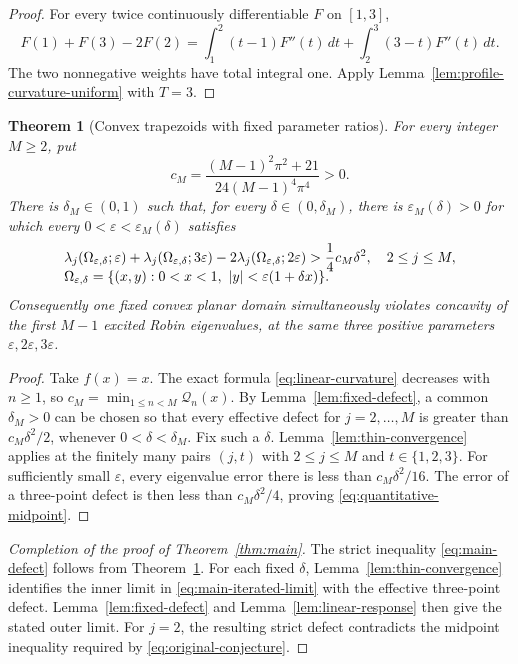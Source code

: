 \documentclass[11pt,a4paper]{article}
\newtheorem{theorem}{Theorem}[section]
\theoremstyle{definition}\newtheorem{definition}[theorem]{Definition}
\theoremstyle{remark}\newtheorem{remark}[theorem]{Remark}
\begin{document}
\begin{proof}
For every twice continuously differentiable $F$ on $[1,3]$,
\[
 F(1)+F(3)-2F(2)
  =\int_1^2(t-1)F''(t)\,dt
     +\int_2^3(3-t)F''(t)\,dt.
\]
The two nonnegative weights have total integral one. Apply
Lemma~\ref{lem:profile-curvature-uniform} with $T=3$.
\end{proof}

\begin{theorem}[Convex trapezoids with fixed parameter ratios]
\label{thm:fixed-ratio-trapezoids}
For every integer $M\geq2$, put
\[
 c_M=\frac{(M-1)^2\pi^2+21}{24(M-1)^4\pi^4}>0.
\]
There is $\delta_M\in(0,1)$ such that, for every
$\delta\in(0,\delta_M)$, there is
$\varepsilon_M(\delta)>0$ for which every
$0<\varepsilon<\varepsilon_M(\delta)$ satisfies
\begin{align}
 &\lambda_j(\Omega_{\varepsilon,\delta};\varepsilon)
 +\lambda_j(\Omega_{\varepsilon,\delta};3\varepsilon)
 -2\lambda_j(\Omega_{\varepsilon,\delta};2\varepsilon)
 >\frac14c_M\delta^2,
 \quad 2\leq j\leq M,\label{eq:quantitative-midpoint}\\[-2mm]
 &\Omega_{\varepsilon,\delta}
 =\{(x,y):0<x<1,\ |y|<\varepsilon(1+\delta x)\}.
 \notag
\end{align}
Consequently one fixed convex planar domain simultaneously
violates concavity of the first $M-1$ excited Robin eigenvalues,
at the same three positive parameters $\varepsilon,2\varepsilon,
3\varepsilon$.
\end{theorem}

\begin{proof}
Take $f(x)=x$. The exact formula
\eqref{eq:linear-curvature} decreases with $n\geq1$, so
$c_M=\min_{1\leq n<M}\mathcal Q_n(x)$. By
Lemma~\ref{lem:fixed-defect}, a common $\delta_M>0$ can be chosen
so that every effective defect for $j=2,\ldots,M$ is greater than
$c_M\delta^2/2$, whenever $0<\delta<\delta_M$. Fix such a
$\delta$. Lemma~\ref{lem:thin-convergence} applies at the finitely
many pairs $(j,t)$ with $2\leq j\leq M$ and $t\in\{1,2,3\}$.
For sufficiently small $\varepsilon$, every eigenvalue error
there is less than $c_M\delta^2/16$. The error of a three-point
defect is then less than $c_M\delta^2/4$, proving
\eqref{eq:quantitative-midpoint}.
\end{proof}


\begin{proof}[Completion of the proof of Theorem~\ref{thm:main}]
The strict inequality \eqref{eq:main-defect} follows from
Theorem~\ref{thm:fixed-ratio-trapezoids}. For each fixed $\delta$,
Lemma~\ref{lem:thin-convergence} identifies the inner limit in
\eqref{eq:main-iterated-limit} with the effective three-point
defect. Lemma~\ref{lem:fixed-defect} and
Lemma~\ref{lem:linear-response} then give the stated outer limit.
For $j=2$, the resulting strict defect contradicts the midpoint
inequality required by \eqref{eq:original-conjecture}.
\end{proof}
\end{document}
